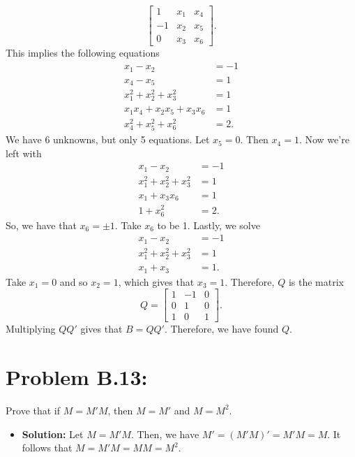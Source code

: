 \documentclass[11pt]{article}
\begin{document}
\begin{itemize}
\[\begin{bmatrix}
1 & x_1 & x_4 \\
-1 & x_2 & x_5 \\
0 & x_3 & x_6
\end{bmatrix}.
\]
This implies the following equations
\begin{align*}
x_1 - x_2 &= -1 \\
x_4 - x_5 &= 1 \\
x_1^2 + x_2^2 + x_3^2 &= 1 \\
 x_1x_4 + x_2x_5 + x_3x_6 &= 1 \\
 x_4^2 + x_5^2 + x_6^2 &= 2.
\end{align*}
We have 6 unknowns, but only 5 equations.  Let $x_5 = 0$.  Then $x_4 = 1$.  Now we're left with
\begin{align*}
x_1 - x_2 &= -1 \\
x_1^2 + x_2^2 + x_3^2 &= 1 \\
x_1 + x_3x_6 &= 1 \\
1 + x_6^2 &= 2.
\end{align*}
So, we have that $x_6 = \pm 1$.  Take $x_6$ to be 1.  Lastly, we solve
\begin{align*}
x_1 - x_2 &= -1 \\
x_1^2 + x_2^2 + x_3^2 &= 1 \\
x_1 + x_3 &= 1.
\end{align*}
Take $x_1 = 0$ and so $x_2 = 1$, which gives that $x_3 = 1$.  Therefore, $Q$ is the matrix
\[
Q = \begin{bmatrix}
1 & -1 & 0 \\
0 & 1 & 0 \\
1 & 0 & 1
\end{bmatrix}.
\]
Multiplying $QQ'$ gives that $B=QQ'$.  Therefore, we have found $Q$.
\end{itemize}
\section*{Problem B.13:}
Prove that if $M = M'M$, then $M = M'$ and $M=M^2$.
\begin{itemize}
\item[] {\bf Solution:}  Let $M = M'M$.  Then, we have $M' = (M'M)' = M'M = M$.  It follows that $M = M' M = MM = M^2$.
\end{itemize}
\end{document}
